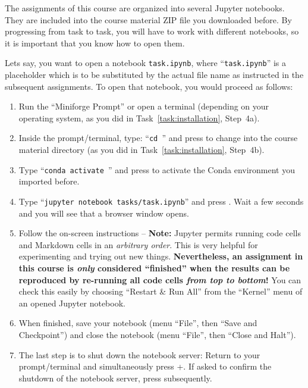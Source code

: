\documentclass[12pt,a4paper]{article}
\begin{document}
The assignments of this course are organized into several Jupyter notebooks. They are included into the course material ZIP file you downloaded before. By progressing from task to task, you will have to work with different notebooks, so it is important that you know how to open them.

Lets say, you want to open a notebook \texttt{task.ipynb}, where ``\texttt{task.ipynb}'' is a placeholder which is to be substituted by the actual file name as instructed in the subsequent assignments. To open that notebook, you would proceed as follows:
\begin{enumerate}
    \item Run the ``Miniforge Prompt'' or open a terminal (depending on your operating system, as you did in Task~\ref{task:installation}, Step~4a).
    \item Inside the prompt/terminal, type: ``\texttt{cd {\projectid}}'' and press \Return to change into the course material directory (as you did in Task~\ref{task:installation}, Step~4b).
    \item Type ``\texttt{conda activate {\projectid}}'' and press \Return to activate the Conda environment you imported before.
    \item Type ``\texttt{jupyter notebook tasks/task.ipynb}'' and press \Return. Wait a few seconds and you will see that a browser window opens.
    \item Follow the on-screen instructions -- \textbf{Note:} Jupyter permits running code cells and Markdown cells in an \emph{arbitrary order}. This is very helpful for experimenting and trying out new things. \textbf{Nevertheless, an assignment in this course is \emph{only} considered ``finished'' when the results can be reproduced by re-running all code cells \emph{from top to bottom}!} You can check this easily by choosing ``Restart \& Run All'' from the ``Kernel'' menu of an opened Jupyter notebook.
    \item When finished, save your notebook (menu ``File'', then ``Save and Checkpoint'') and close the notebook (menu ``File'', then ``Close and Halt'').
    \item The last step is to shut down the notebook server: Return to your prompt/terminal and simultaneously press \Ctrl+. If asked to confirm the shutdown of the notebook server, press \Return subsequently.
\end{enumerate}
\end{document}
